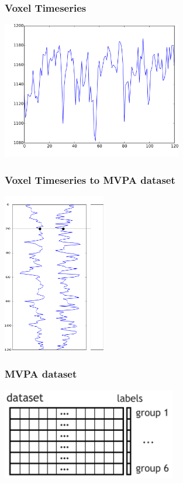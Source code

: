 \documentclass{beamer}
\begin{document}
  \begin{frame}
    \frametitle{Voxel Timeseries}
        \begin{center}
            \includegraphics[height=6cm]{../pictures/time_series1}
        \end{center}
    \end{frame}

  \begin{frame}
    \frametitle{Voxel Timeseries to MVPA dataset}
        \begin{center}
            \includegraphics[height=7cm]{../pictures/time_series2dataset}
        \end{center}
    \end{frame}

  \begin{frame}
    \frametitle{MVPA dataset}
        \begin{center}
            \includegraphics[height=4cm]{../pictures/mvpa_dataset}
        \end{center}
    \end{frame}
\end{document}
